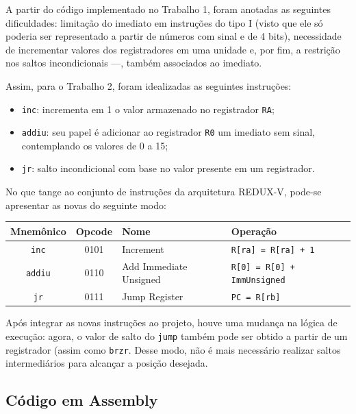 \documentclass[twocolumn, 11pt]{article}
\begin{document}
A partir do código implementado no Trabalho 1, foram anotadas as seguintes dificuldades: limitação do imediato em instruções do tipo I (visto que ele só poderia ser representado a partir de números com sinal e de 4 bits), necessidade de incrementar valores dos registradores em uma unidade e, por fim, a restrição nos saltos incondicionais —, também associados ao imediato.

Assim, para o Trabalho 2, foram idealizadas as seguintes instruções:

\begin{itemize}
    \item \texttt{inc}: incrementa em 1 o valor armazenado no registrador \texttt{RA};
    \item \texttt{addiu}: seu papel é adicionar ao registrador \texttt{R0} um imediato sem sinal, contemplando os valores de 0 a 15;
    \item \texttt{jr}: salto incondicional com base no valor presente em um registrador.
\end{itemize}

No que tange ao conjunto de instruções da arquitetura REDUX-V, pode-se apresentar as novas do seguinte modo:

\begin{center}
\scriptsize
\renewcommand{\arraystretch}{1.1} %
\setlength{\tabcolsep}{2pt} %
\begin{tabular}{|c|c|p{2cm}|p{2cm}|}
\hline
\textbf{Mnemônico} & \textbf{Opcode} & \textbf{Nome} & \textbf{Operação} \\ \hline
\texttt{inc} & 0101 & Increment & \texttt{R[ra] = R[ra] + 1} \\ \hline
\texttt{addiu} & 0110 & Add Immediate Unsigned & \texttt{R[0] = R[0] + ImmUnsigned} \\ \hline
\texttt{jr} & 0111 & Jump Register & \texttt{PC = R[rb]} \\ \hline
\end{tabular}
\end{center}

Após integrar as novas instruções ao projeto, houve uma mudança na lógica de execução: agora, o valor de salto do \texttt{jump} também pode ser obtido a partir de um registrador (assim como \texttt{brzr}. Desse modo, não é mais necessário realizar saltos intermediários para alcançar a posição desejada.

\subsection{Código em Assembly}
\end{document}
